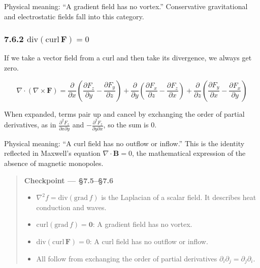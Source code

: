 \documentclass[a4paper,12pt,openany]{book}
\begin{document}
Physical meaning: ``A gradient field has no vortex.'' Conservative
gravitational and electrostatic fields fall into this category.

\hypertarget{mathrmdivmathrmcurlmathbff-0}{%
\subsubsection{\texorpdfstring{7.6.2
\(\mathrm{div}(\mathrm{curl}\,\mathbf{F}) = 0\)}{7.6.2 \textbackslash mathrm\{div\}(\textbackslash mathrm\{curl\}\textbackslash,\textbackslash mathbf\{F\}) = 0}}\label{mathrmdivmathrmcurlmathbff-0}}

If we take a vector field from a curl and then take its divergence, we
always get zero.

\[\nabla \cdot (\nabla \times \mathbf{F}) = \frac{\partial}{\partial x}\!\left(\frac{\partial F_z}{\partial y} - \frac{\partial F_y}{\partial z}\right) + \frac{\partial}{\partial y}\!\left(\frac{\partial F_x}{\partial z} - \frac{\partial F_z}{\partial x}\right) + \frac{\partial}{\partial z}\!\left(\frac{\partial F_y}{\partial x} - \frac{\partial F_x}{\partial y}\right)\]

When expanded, terms pair up and cancel by exchanging the order of
partial derivatives, as in
\(\frac{\partial^2 F_z}{\partial x\partial y}\) and
\(-\frac{\partial^2 F_z}{\partial y\partial x}\), so the sum is \(0\).

Physical meaning: ``A curl field has no outflow or inflow.'' This is the
identity reflected in Maxwell's equation \(\nabla\cdot\mathbf B=0\), the
mathematical expression of the absence of magnetic monopoles.

\begin{quote}
\textbf{Checkpoint — §7.5–§7.6}

\begin{itemize}
\item
  \(\nabla^2 f = \mathrm{div}(\mathrm{grad}\,f)\) is the Laplacian of a
  scalar field. It describes heat conduction and waves.
\item
  \(\mathrm{curl}(\mathrm{grad}\,f) = \mathbf{0}\): A gradient field has
  no vortex.
\item
  \(\mathrm{div}(\mathrm{curl}\,\mathbf{F}) = 0\): A curl field has no
  outflow or inflow.
\item
  All follow from exchanging the order of partial derivatives
  \(\partial_i\partial_j = \partial_j\partial_i\).
\end{itemize}
\end{quote}
\end{document}
